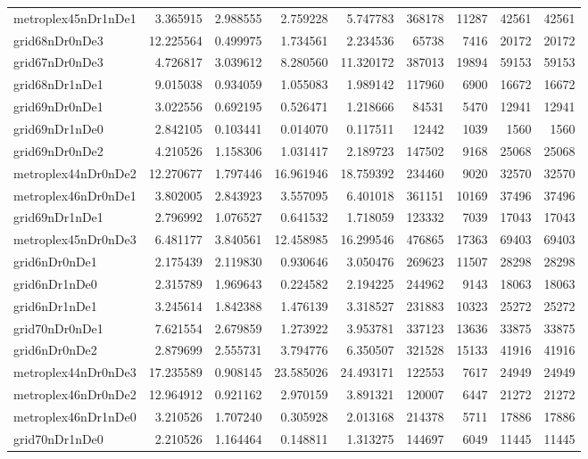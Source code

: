 \begin{longtable}{|l|r|r|r|r|r|r|r|r|}
metroplex45nDr1nDe1 & 3.365915 & 2.988555 & 2.759228 & 5.747783 & 368178 & 11287 & 42561 & 42561 \\
grid68nDr0nDe3 & 12.225564 & 0.499975 & 1.734561 & 2.234536 & 65738 & 7416 & 20172 & 20172 \\
grid67nDr0nDe3 & 4.726817 & 3.039612 & 8.280560 & 11.320172 & 387013 & 19894 & 59153 & 59153 \\
grid68nDr1nDe1 & 9.015038 & 0.934059 & 1.055083 & 1.989142 & 117960 & 6900 & 16672 & 16672 \\
grid69nDr0nDe1 & 3.022556 & 0.692195 & 0.526471 & 1.218666 & 84531 & 5470 & 12941 & 12941 \\
grid69nDr1nDe0 & 2.842105 & 0.103441 & 0.014070 & 0.117511 & 12442 & 1039 & 1560 & 1560 \\
grid69nDr0nDe2 & 4.210526 & 1.158306 & 1.031417 & 2.189723 & 147502 & 9168 & 25068 & 25068 \\
metroplex44nDr0nDe2 & 12.270677 & 1.797446 & 16.961946 & 18.759392 & 234460 & 9020 & 32570 & 32570 \\
metroplex46nDr0nDe1 & 3.802005 & 2.843923 & 3.557095 & 6.401018 & 361151 & 10169 & 37496 & 37496 \\
grid69nDr1nDe1 & 2.796992 & 1.076527 & 0.641532 & 1.718059 & 123332 & 7039 & 17043 & 17043 \\
metroplex45nDr0nDe3 & 6.481177 & 3.840561 & 12.458985 & 16.299546 & 476865 & 17363 & 69403 & 69403 \\
grid6nDr0nDe1 & 2.175439 & 2.119830 & 0.930646 & 3.050476 & 269623 & 11507 & 28298 & 28298 \\
grid6nDr1nDe0 & 2.315789 & 1.969643 & 0.224582 & 2.194225 & 244962 & 9143 & 18063 & 18063 \\
grid6nDr1nDe1 & 3.245614 & 1.842388 & 1.476139 & 3.318527 & 231883 & 10323 & 25272 & 25272 \\
grid70nDr0nDe1 & 7.621554 & 2.679859 & 1.273922 & 3.953781 & 337123 & 13636 & 33875 & 33875 \\
grid6nDr0nDe2 & 2.879699 & 2.555731 & 3.794776 & 6.350507 & 321528 & 15133 & 41916 & 41916 \\
metroplex44nDr0nDe3 & 17.235589 & 0.908145 & 23.585026 & 24.493171 & 122553 & 7617 & 24949 & 24949 \\
metroplex46nDr0nDe2 & 12.964912 & 0.921162 & 2.970159 & 3.891321 & 120007 & 6447 & 21272 & 21272 \\
metroplex46nDr1nDe0 & 3.210526 & 1.707240 & 0.305928 & 2.013168 & 214378 & 5711 & 17886 & 17886 \\
grid70nDr1nDe0 & 2.210526 & 1.164464 & 0.148811 & 1.313275 & 144697 & 6049 & 11445 & 11445 \\

\end{longtable}
